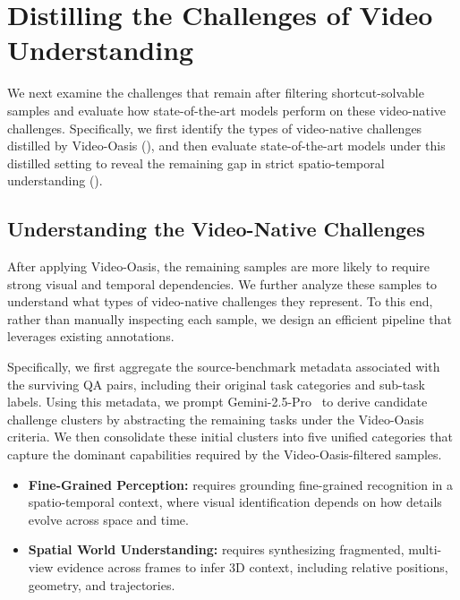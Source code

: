 \documentclass[runningheads]{llncs}
\begin{document}
\section{Distilling the Challenges of Video Understanding}
\label{sec:benchmark}
{
    We next examine the challenges that remain after filtering shortcut-solvable samples and evaluate how state-of-the-art models perform on these video-native challenges.
    Specifically, we first identify the types of video-native challenges distilled by Video-Oasis (), and then evaluate state-of-the-art models under this distilled setting to reveal the remaining gap in strict spatio-temporal understanding (). \vspace{-4mm}

    \subsection{Understanding the Video-Native Challenges}    
    \label{sec:4.1}
        After applying Video-Oasis, the remaining samples are more likely to require strong visual and temporal dependencies.
        We further analyze these samples to understand what types of video-native challenges they represent.
        To this end, rather than manually inspecting each sample, we design an efficient pipeline that leverages existing annotations.

        Specifically, we first aggregate the source-benchmark metadata associated with the surviving QA pairs, including their original task categories and sub-task labels.
        Using this metadata, we prompt Gemini-2.5-Pro~\cite{gemini25} to derive candidate challenge clusters by abstracting the remaining tasks under the Video-Oasis criteria.
        We then consolidate these initial clusters into five unified categories that capture the dominant capabilities required by the Video-Oasis-filtered samples.
        
        \begin{itemize}
            \item \textbf{Fine-Grained Perception:} requires grounding fine-grained recognition in a spatio-temporal context, where visual identification depends on how details evolve across space and time.
            
            \item \textbf{Spatial World Understanding:} requires synthesizing fragmented, multi-view evidence across frames to infer 3D context, including relative positions, geometry, and trajectories.
            

\end{itemize}}
\end{document}
